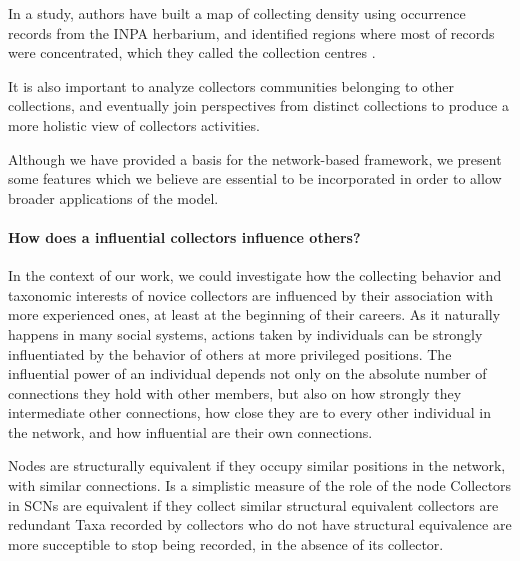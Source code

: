 In a study, authors have built a map of collecting density using occurrence records from the INPA herbarium, and identified regions where most of records were concentrated, which they called the collection centres \cite{Nelson1990}.


It is also important to analyze collectors communities belonging to other collections, and eventually join perspectives from distinct collections to produce a more holistic view of collectors activities.





Although we have provided a basis for the network-based framework, we present some features which we believe are essential to be incorporated in order to allow broader applications of the model.

\paragraph*{How does a influential collectors influence others?}
In the context of our work, we could investigate how the collecting behavior and taxonomic interests of novice collectors are influenced by their association with more experienced ones, at least at the beginning of their careers.
As it naturally happens in many social systems, actions taken by individuals can be strongly influentiated by the behavior of others at more privileged positions.
The influential power of an individual depends not only on the absolute number of connections they hold with other members, but also on how strongly they intermediate other connections, how close they are to every other individual in the network, and how influential are their own connections.

Nodes are structurally equivalent if they occupy similar positions in the network, with similar connections.
Is a simplistic measure of the role of the node
Collectors in SCNs are equivalent if they collect similar 
structural equivalent collectors are redundant
Taxa recorded by collectors who do not have structural equivalence are more succeptible to stop being recorded, in the absence of its collector.


